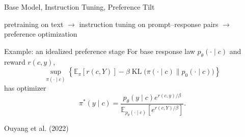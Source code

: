 \documentclass[aspectratio=169,11pt]{beamer}
\newcommand{\R}{\mathbb{R}}
\newcommand{\E}{\mathbb{E}}
\newcommand{\onslidecite}[1]{\par\vspace{0.4ex}\hfill{\scriptsize\color{black!60}#1}}
\DeclareMathOperator{\KL}{KL}
\begin{document}
\begin{frame}{Base Model, Instruction Tuning, Preference Tilt}
\begin{center}
pretraining on text
$\longrightarrow$
instruction tuning on prompt--response pairs
$\longrightarrow$
preference optimization
\end{center}

\begin{block}{Example: an idealized preference stage}
For base response law $p_\theta(\cdot\mid c)$ and reward $r(c,y)$,
\[
 \sup_{\pi(\cdot \mid c)}\left\{\E_\pi[r(c,Y)]
 -\beta\KL\bigl(\pi(\cdot\mid c)\|p_0(\cdot\mid c)\bigr)\right\}
\]
has optimizer
\[
 \pi^*(y\mid c)=
 \frac{p_\theta(y\mid c)e^{r(c,y)/\beta}}
      {\E_{p_\theta(\cdot\mid c)}[e^{r(c,Y)/\beta}]}.
\]
\end{block}

\onslidecite{Ouyang et al. (2022)}
\end{frame}







\end{document}
